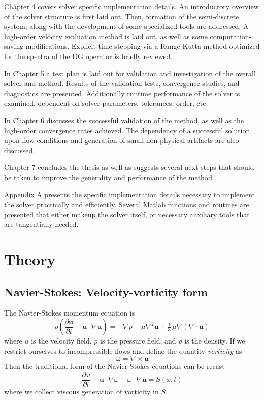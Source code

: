\documentclass[letterpaper,12pt]{report}
\newcommand{\be}{\begin{equation}}
\newcommand{\ben}[1]{\begin{equation}\label{#1}}
\newcommand{\ee}{\end{equation}}
\begin{document}
Chapter 4 covers solver specific implementation details. An introductory overview of the solver structure is first laid out. Then, formation of the semi-discrete system, along with the development of some specialized tools are addressed. A high-order velocity evaluation method is laid out, as well as some computation-saving modifications. Explicit time-stepping via a Runge-Kutta method optimized for the spectra of the DG operator is briefly reviewed.

In Chapter 5 a test plan is laid out for validation and investigation of the overall solver and method. Results of the validation tests, convergence studies, and diagnostics are presented. Additionally runtime performance of the solver is examined, dependent on solver parameters, tolerances, order, etc.

In Chapter 6 discusses the successful validation of the method, as well as the high-order convergence rates achieved. The dependency of a successful solution upon flow conditions and generation of small non-physical artifacts are also discussed.

Chapter 7 concludes the thesis as well as suggests several next steps that should be taken to improve the generality and performance of the method.

Appendix A presents the specific implementation details necessary to implement the solver practically and efficiently. Several Matlab functions and routines are presented that either makeup the solver itself, or necessary auxiliary tools that are tangentially needed.

\chapter{Theory}
\section{Navier-Stokes: Velocity-vorticity form}
The Navier-Stokes momentum equation is
 \be \rho \left(\frac{\partial \mathbf{u}}{\partial t} + \mathbf{u} \cdot \nabla \mathbf{u} \right) = -\nabla p + \mu \nabla^2 \mathbf u + \tfrac13 \, \mu \nabla (\nabla\cdot\mathbf{u}) \ee
where $u$ is the velocity field, $p$ is the pressure field, and $\rho$ is the density. If we restrict ourselves to incompressible flows and define the quantity \textit{vorticity} as
\be \mathbf{\omega} = \nabla \times \mathbf{u} \ee
Then the traditional form of the Navier-Stokes equations can be recast
\ben{VV3D} \frac{\partial \omega}{\partial t} +  \mathbf{u} \cdot \nabla \omega - \omega \cdot \nabla  \mathbf{u} = S(x,t)\ee
where we collect viscous generation of vorticity in $S$.
\end{document}
